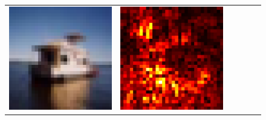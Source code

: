 \documentclass[preprint,12pt]{elsarticle}
\begin{document}
\begin{figure}[p]
\begin{tabular}{cccccc}
  \includegraphics[scale=\scale]{../visualizations/examples/cifar10/cnn/images/8.png} &
  \includegraphics[scale=\scale]{../visualizations/examples/cifar10/cnn/saliency_map/8.png} & 

\end{tabular}
\end{figure}
\end{document}
